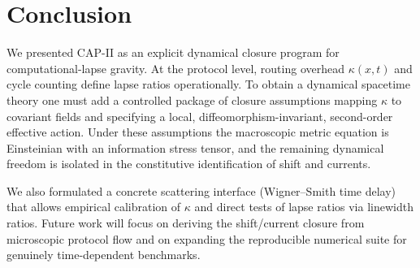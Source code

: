 \section{Conclusion}
\label{sec:conclusion}

We presented CAP-II as an explicit dynamical closure program for computational-lapse gravity.
At the protocol level, routing overhead $\kappa(x,t)$ and cycle counting define lapse ratios operationally.
To obtain a dynamical spacetime theory one must add a controlled package of closure assumptions mapping $\kappa$ to covariant fields and specifying a local, diffeomorphism-invariant, second-order effective action.
Under these assumptions the macroscopic metric equation is Einsteinian with an information stress tensor, and the remaining dynamical freedom is isolated in the constitutive identification of shift and currents.

We also formulated a concrete scattering interface (Wigner--Smith time delay) that allows empirical calibration of $\kappa$ and direct tests of lapse ratios via linewidth ratios.
Future work will focus on deriving the shift/current closure from microscopic protocol flow and on expanding the reproducible numerical suite for genuinely time-dependent benchmarks.


